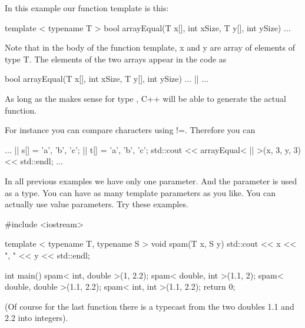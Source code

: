In this example our function template is this:

\begin{consolethree}[escapeinside=||]
template < typename T >
bool arrayEqual(T x[], int xSize, T y[], int ySize)
{
    ...
}
\end{consolethree}

Note that in the body of the function template, x and y are array of
elements of type T. The elements of the two arrays appear in the code as

\begin{consolethree}[escapeinside=||]
bool arrayEqual(T x[], int xSize, T y[], int ySize)
{
    ...
    ||
    ...
}
\end{consolethree}

As long as the \EMPHASIZE{!=} makes sense for type , C++ will be able to generate the actual function.

For instance you can compare characters using !=. Therefore you can

\begin{consolethree}[escapeinside=||]
...
|| s[] = {'a', 'b', 'c'};
|| t[] = {'a', 'b', 'c'};
std::cout << arrayEqual< || >(x, 3, y, 3)
          << std::endl;
...
\end{consolethree}




\newpage{}

In all previous examples we have only one parameter. And the parameter
is used as a type. You can have as many template parameters as you like.
You can actually use value parameters. Try these examples.

\begin{consolethree}[escapeinside=||]
#include <iostream>

template < typename T, typename S >
void spam(T x, S y)
{
    std::cout << x << ", " << y << std::endl;
}

int main()
{
    spam< int, double >(1, 2.2);
    spam< double, int >(1.1, 2);
    spam< double, double >(1.1, 2.2);
    spam< int, int >(1.1, 2.2);
    return 0;
}
\end{consolethree}

(Of course for the last function there is a typecast from the two
doubles 1.1 and 2.2 into integers).

